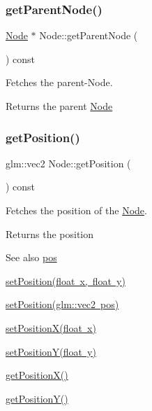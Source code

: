 \subsubsection{\texorpdfstring{getParentNode()}{getParentNode()}}
{\footnotesize\ttfamily \mbox{\hyperlink{classsage_1_1Node}{Node}} $\ast$ Node\+::get\+Parent\+Node (\begin{DoxyParamCaption}{ }\end{DoxyParamCaption}) const\hspace{0.3cm}{\ttfamily [protected]}}



Fetches the parent-\/\+Node. 

\begin{DoxyReturn}{Returns}
the parent \mbox{\hyperlink{classsage_1_1Node}{Node}} 
\end{DoxyReturn}
\mbox{\label{classsage_1_1Node_a67eb5862f4da3cc4b2219a7e555a5678}} 
\subsubsection{\texorpdfstring{getPosition()}{getPosition()}}
{\footnotesize\ttfamily glm\+::vec2 Node\+::get\+Position (\begin{DoxyParamCaption}{ }\end{DoxyParamCaption}) const}



Fetches the position of the \mbox{\hyperlink{classsage_1_1Node}{Node}}. 

\begin{DoxyReturn}{Returns}
the position 
\end{DoxyReturn}
\begin{DoxySeeAlso}{See also}
\mbox{\hyperlink{classsage_1_1Node_a7e0ae6eeb84fae60e54e6685c982b0b2}{pos}} 

\mbox{\hyperlink{classsage_1_1Node_aaa8545c103ef1b35e5076dbedab93af5}{set\+Position(float x, float y)}} 

\mbox{\hyperlink{classsage_1_1Node_ae2731cefe38e706c2bf21afae6da18b3}{set\+Position(glm\+::vec2 pos)}} 

\mbox{\hyperlink{classsage_1_1Node_ae1dfc73d6122a95778d5d9db3d1fd913}{set\+Position\+X(float x)}} 

\mbox{\hyperlink{classsage_1_1Node_a5c97d36655f0daa71a5f6c715d2b0470}{set\+Position\+Y(float y)}} 

\mbox{\hyperlink{classsage_1_1Node_a17e92da5beaeb4b299c4e93729a22b1a}{get\+Position\+X()}} 

\mbox{\hyperlink{classsage_1_1Node_a26337a40b7da400233451b71e85759cc}{get\+Position\+Y()}} 
\end{DoxySeeAlso}
\mbox{\label{classsage_1_1Node_a17e92da5beaeb4b299c4e93729a22b1a}} 

